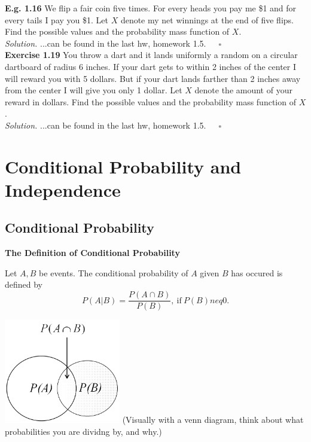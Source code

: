 \documentclass[12pt]{book}
\begin{document}
\noindent \textbf{E.g. 1.16} We flip a fair coin five times. For every heads you pay me \$1 and for every tails I pay you \$1. Let $X$ denote my net winnings at the end of five flips. Find the possible values and the probability mass function of $X$.\\
\textit{Solution.} ...can be found in the last hw, homework 1.5.~~~$\square$\\

\noindent \textbf{Exercise 1.19} You throw a dart and it lands uniformly a random on a circular dartboard of radius 6 inches. If your dart gets to within 2 inches of the center I will reward you with 5 dollars. But if your dart lands farther than 2 inches away from the center I will give you only 1 dollar. Let $X$ denote the amount of your reward in dollars. Find the possible values and the probability mass function of $X$.\\
\textit{Solution.} ...can be found in the last hw, homework 1.5.~~~$\square$





\chapter{Conditional Probability and Independence}
\section{Conditional Probability}
\textbf{The Definition of Conditional Probability}
\begin{center}
Let $A,B$ be events. The conditional probability of $A$ given $B$ has occured is defined by
$$P(A|B)=\frac{P(A\cap B)}{P(B)},~\text{if}~P(B)neq0.$$
\end{center}

\includegraphics[width=2in]{Conditional Prob Venn Diagram.png}
(Visually with a venn diagram, think about what probabilities you are dividng by, and why.)
\newpage
\end{document}
